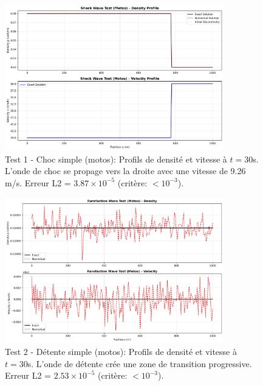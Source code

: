 
\begin{figure}[h!]
\centering
\includegraphics[width=0.85\textwidth]{SPRINT2_DELIVERABLES/figures/test1_shock_motos.png}
\caption{Test 1 - Choc simple (motos): Profils de densité et vitesse à $t=30$s. 
L'onde de choc se propage vers la droite avec une vitesse de 9.26 m/s. 
Erreur L2 = $3.87 \times 10^{-5}$ (critère: $< 10^{-3}$).}
\label{fig:riemann_choc_motos}
\end{figure}

\begin{figure}[h!]
\centering
\includegraphics[width=0.85\textwidth]{SPRINT2_DELIVERABLES/figures/test2_rarefaction_motos.png}
\caption{Test 2 - Détente simple (motos): Profils de densité et vitesse à $t=30$s. 
L'onde de détente crée une zone de transition progressive. 
Erreur L2 = $2.53 \times 10^{-5}$ (critère: $< 10^{-3}$).}
\label{fig:riemann_rarefaction_motos}
\end{figure}

